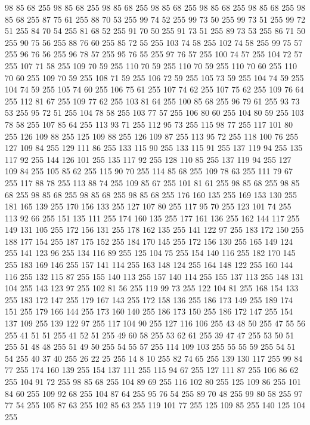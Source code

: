 98 85 68 255 98 85 68 255 98 85 68 255 98 85 68 255 98 85 68 255 98 85 68 255 98 85 68 255 87 75 61 255 88 70 53 255 99 74 52 255 99 73 50 255 99 73 51 255 99 72 51 255 84 70 54 255 81 68 52 255 91 70 50 255 91 73 51 255 89 73 53 255 86 71 50 255 90 75 56 255 88 76 60 255 85 72 55 255 103 74 58 255 102 74 58 255 99 75 57 255 96 76 56 255 96 78 57 255 95 76 55 255 97 76 57 255 100 74 57 255 104 72 57 255 107 71 58 255 109 70 59 255 110 70 59 255 110 70 59 255 110 70 60 255 110 70 60 255 109 70 59 255 108 71 59 255 106 72 59 255 105 73 59 255 104 74 59 255 104 74 59 255 105 74 60 255 106 75 61 255 107 74 62 255 107 75 62 255 109 76 64 255 112 81 67 255 109 77 62 255 103 81 64 255 100 85 68 255 96 79 61 255 93 73 53 255 95 72 51 255 104 78 58 255 103 77 57 255 106 80 60 255 104 80 59 255 103 78 58 255 107 85 64 255 113 93 71 255 112 95 73 255 115 98 77 255
117 101 80 255 126 109 88 255 125 109 88 255 126 109 87 255 113 95 72 255 118 100 76 255 127 109 84 255 129 111 86 255 133 115 90 255 133 115 91 255 137 119 94 255 135 117 92 255 144 126 101 255 135 117 92 255 128 110 85 255 137 119 94 255 127 109 84 255 105 85 62 255 115 90 70 255 114 85 68 255 109 78 63 255 111 79 67 255 117 88 78 255 113 88 74 255 109 85 67 255 101 81 61 255 98 85 68 255 98 85 68 255 98 85 68 255 98 85 68 255 98 85 68 255 176 160 135 255 169 153 130 255 181 165 139 255 170 156 133 255 127 107 80 255 117 95 70 255 123 101 74 255 113 92 66 255 151 135 111 255 174 160 135 255 177 161 136 255 162 144 117 255 149 131 105 255 172 156 131 255 178 162 135 255 141 122 97 255 183 172 150 255 188 177 154 255 187 175 152 255 184 170 145 255 172 156 130 255 165 149 124 255 141 123 96 255 134 116 89 255 125 104 75 255 154 140 116 255 182 170 145 255 183 169 146 255 157 141 114 255 163 148 124 255 164 148 122 255 160 144 116 255 132 115 87 255
155 140 113 255 157 140 114 255 155 137 113 255 148 131 104 255 143 123 97 255 102 81 56 255 119 99 73 255 122 104 81 255 168 154 133 255 183 172 147 255 179 167 143 255 172 158 136 255 186 173 149 255 189 174 151 255 179 166 144 255 173 160 140 255 186 173 150 255 186 172 147 255 154 137 109 255 139 122 97 255 117 104 90 255 127 116 106 255 43 48 50 255 47 55 56 255 41 51 51 255 41 52 51 255 49 60 58 255 53 62 61 255 39 47 47 255 53 50 51 255 51 48 48 255 51 49 50 255 54 55 57 255 114 109 103 255 55 55 59 255 54 51 54 255 40 37 40 255 26 22 25 255 14 8 10 255 82 74 65 255 139 130 117 255 99 84 77 255 174 160 139 255 154 137 111 255 115 94 67 255 127 111 87 255 106 86 62 255 104 91 72 255 98 85 68 255 104 89 69 255 116 102 80 255 125 109 86 255 101 84 60 255 109 92 68 255 104 87 64 255 95 76 54 255 89 70 48 255 99 80 58 255 97 77 54 255 105 87 63 255 102 85 63 255 119 101 77 255 125 109 85 255 140 125 104 255
